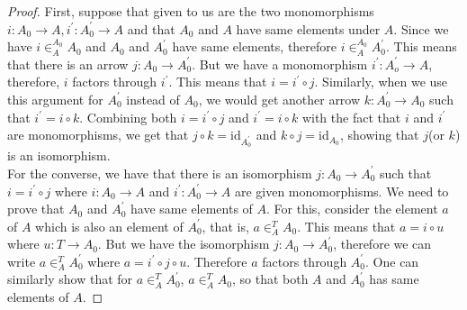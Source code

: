 \documentclass{article}
\theoremstyle{definition}
\theoremstyle{remark}
\theoremstyle{definition}
\theoremstyle{definition}
\theoremstyle{definition}
\newcommand{\Id}[1]{\text{id}_{#1}}
\newcommand{\elem}[1]{\in ^{#1}}
\begin{document}
\begin{proof}
	First, suppose that given to us are the two monomorphisms $ i : A_0 \to A, i^{\prime} : A_0^{\prime}\to A $ and that $ A_0 $ and $ A $ have same elements under $ A $. Since we have $ i \elem{A_0}_A A_0 $ and $ A_0 $ and $ A_0^{\prime} $ have same elements, therefore $ i\elem{A_0}_A A_0^{\prime} $. This means that there is an arrow $ j : A_0 \to A_0^{\prime} $. But we have a monomorphism $ i^{\prime} : A_o^{\prime} \to A $, therefore, $ i $ factors through $ i^{\prime} $. This means that $ i = i^{\prime} \circ j $. Similarly, when we use this argument for $ A_0^{\prime} $ instead of $ A_0 $, we would get another arrow $ k : A_0^{\prime} \to A_0 $ such that $ i^{\prime} = i\circ k $. Combining both $ i = i^{\prime}\circ j $ and $ i^{\prime} = i\circ k $ with the fact that $ i $ and $ i^{\prime} $ are monomorphisms, we get that $ j\circ k = \Id{A_0^{\prime}} $ and $ k\circ j = \Id{A_0}$, showing that $ j $(or $ k $) is an isomorphism.\\
	For the converse, we have that there is an isomorphism $ j : A_0 \to A_0^{\prime} $ such that $ i = i^{\prime}\circ j  $ where $ i : A_0 \to A $ and $ i^{\prime} : A_0^{\prime} \to A $ are given monomorphisms. We need to prove that $ A_0 $ and $ A_0^{\prime} $ have same elements of $ A $. For this, consider the element $ a $ of $ A $ which is also an element of $ A_0^{\prime} $, that is, $ a\elem{T}_A A_0 $. This means that $ a = i\circ u $ where $ u: T\to A_0 $. But we have the isomorphism $ j : A_0 \to A_0^{\prime} $, therefore we can write $ a \elem{T}_A A_0^{\prime} $ where $ a = i^{\prime}\circ j\circ u $. Therefore $ a $ factors through $ A_0^{\prime} $. One can similarly show that for $ a\elem{T}_A A_0^{\prime} $, $ a\elem{T}_A A_0 $, so that both $ A $ and $ A_0^{\prime} $ has same elements of $ A $.
\end{proof}
\hrulefill
\end{document}

